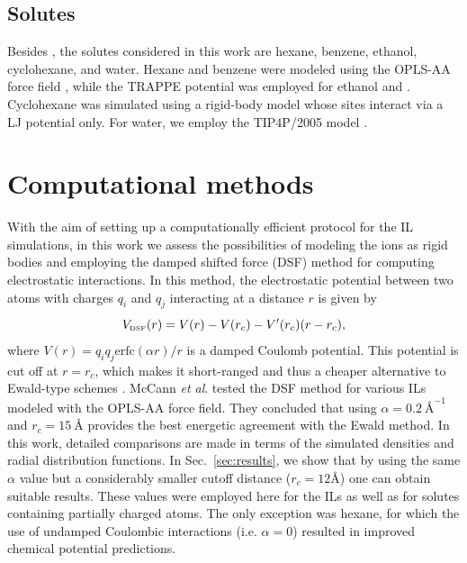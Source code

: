 \documentclass[3p,twocolumn]{elsarticle}
\begin{document}
\subsection{Solutes}
\label{sec:force_field_sol}

Besides , the solutes considered in this work are hexane, benzene, ethanol, cyclohexane, and water.
Hexane and benzene were modeled using the OPLS-AA force field \cite{Jorgensen_1996}, while the TRAPPE potential \cite{Chen_2001,Potoff_2001} was employed for ethanol and .
Cyclohexane was simulated using a rigid-body model \cite{munoz2015lennard} whose sites interact via a LJ potential only.
For water, we employ the TIP4P/2005 model \cite{Abascal_2005,Vega_2011}.

\section{Computational methods}
\label{sec:sim_details}

With the aim of setting up a computationally efficient protocol for the IL simulations, in this work we assess the possibilities of modeling the ions as rigid bodies and employing the damped shifted force (DSF) method \cite{Fennell2006} for computing electrostatic interactions.
In this method, the electrostatic potential between two atoms with charges $q_i$ and $q_j$ interacting at a distance $r$ is given by
\begin{equation}
V_\text{\tiny DSF}(r) = V(r) - V(r_c) - V^\prime(r_c)(r-r_c),
\end{equation}
where $V(r) = q_i q_j {\text{erfc}(\alpha r)}/{r}$ is a damped Coulomb potential.
This potential is cut off at $r = r_c$, which makes it short-ranged and thus a cheaper alternative to Ewald-type schemes \cite{Ewald_1921,Darden_1993,Hockney_1988}.
McCann \textit{et al}. \cite{McCann_2013} tested the DSF method for various ILs modeled with the OPLS-AA force field.
They concluded that using $\alpha = 0.2~\text{\AA}^{-1}$ and $r_c = 15~\text{\AA}$ provides the best energetic agreement with the Ewald method.
In this work, detailed comparisons are made in terms of the simulated densities and radial distribution functions.
In Sec.~\ref{sec:results}, we show that by using the same $\alpha$ value but a considerably smaller cutoff distance ($r_c = 12 \text{\AA}$) one can obtain suitable results.
These values were employed here for the ILs as well as for solutes containing partially charged atoms.
The only exception was hexane, for which the use of undamped Coulombic interactions (i.e. $\alpha = 0$) resulted in improved chemical potential predictions.
\end{document}
